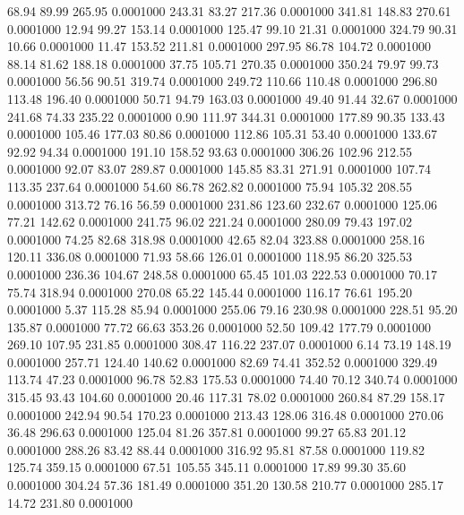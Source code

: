   68.94   89.99  265.95   0.0001000
 243.31   83.27  217.36   0.0001000
 341.81  148.83  270.61   0.0001000
  12.94   99.27  153.14   0.0001000
 125.47   99.10   21.31   0.0001000
 324.79   90.31   10.66   0.0001000
  11.47  153.52  211.81   0.0001000
 297.95   86.78  104.72   0.0001000
  88.14   81.62  188.18   0.0001000
  37.75  105.71  270.35   0.0001000
 350.24   79.97   99.73   0.0001000
  56.56   90.51  319.74   0.0001000
 249.72  110.66  110.48   0.0001000
 296.80  113.48  196.40   0.0001000
  50.71   94.79  163.03   0.0001000
  49.40   91.44   32.67   0.0001000
 241.68   74.33  235.22   0.0001000
   0.90  111.97  344.31   0.0001000
 177.89   90.35  133.43   0.0001000
 105.46  177.03   80.86   0.0001000
 112.86  105.31   53.40   0.0001000
 133.67   92.92   94.34   0.0001000
 191.10  158.52   93.63   0.0001000
 306.26  102.96  212.55   0.0001000
  92.07   83.07  289.87   0.0001000
 145.85   83.31  271.91   0.0001000
 107.74  113.35  237.64   0.0001000
  54.60   86.78  262.82   0.0001000
  75.94  105.32  208.55   0.0001000
 313.72   76.16   56.59   0.0001000
 231.86  123.60  232.67   0.0001000
 125.06   77.21  142.62   0.0001000
 241.75   96.02  221.24   0.0001000
 280.09   79.43  197.02   0.0001000
  74.25   82.68  318.98   0.0001000
  42.65   82.04  323.88   0.0001000
 258.16  120.11  336.08   0.0001000
  71.93   58.66  126.01   0.0001000
 118.95   86.20  325.53   0.0001000
 236.36  104.67  248.58   0.0001000
  65.45  101.03  222.53   0.0001000
  70.17   75.74  318.94   0.0001000
 270.08   65.22  145.44   0.0001000
 116.17   76.61  195.20   0.0001000
   5.37  115.28   85.94   0.0001000
 255.06   79.16  230.98   0.0001000
 228.51   95.20  135.87   0.0001000
  77.72   66.63  353.26   0.0001000
  52.50  109.42  177.79   0.0001000
 269.10  107.95  231.85   0.0001000
 308.47  116.22  237.07   0.0001000
   6.14   73.19  148.19   0.0001000
 257.71  124.40  140.62   0.0001000
  82.69   74.41  352.52   0.0001000
 329.49  113.74   47.23   0.0001000
  96.78   52.83  175.53   0.0001000
  74.40   70.12  340.74   0.0001000
 315.45   93.43  104.60   0.0001000
  20.46  117.31   78.02   0.0001000
 260.84   87.29  158.17   0.0001000
 242.94   90.54  170.23   0.0001000
 213.43  128.06  316.48   0.0001000
 270.06   36.48  296.63   0.0001000
 125.04   81.26  357.81   0.0001000
  99.27   65.83  201.12   0.0001000
 288.26   83.42   88.44   0.0001000
 316.92   95.81   87.58   0.0001000
 119.82  125.74  359.15   0.0001000
  67.51  105.55  345.11   0.0001000
  17.89   99.30   35.60   0.0001000
 304.24   57.36  181.49   0.0001000
 351.20  130.58  210.77   0.0001000
 285.17   14.72  231.80   0.0001000
